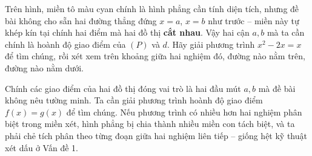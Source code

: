 \begin{center}
\end{center}

\begin{hopgoiy}
Trên hình, miền tô màu cyan chính là hình phẳng cần tính diện tích, nhưng đề bài không cho sẵn hai đường thẳng đứng $x=a$, $x=b$ như trước -- miền này tự khép kín tại chính hai điểm mà hai đồ thị \textbf{cắt nhau}. Vậy hai cận $a, b$ mà ta cần chính là hoành độ giao điểm của $(P)$ và $d$. Hãy giải phương trình $x^2-2x=x$ để tìm chúng, rồi xét xem trên khoảng giữa hai nghiệm đó, đường nào nằm trên, đường nào nằm dưới.
\end{hopgoiy}

\begin{hopyduong}
Chính các giao điểm của hai đồ thị đóng vai trò là hai đầu mút $a, b$ mà đề bài không nêu tường minh. Ta cần giải phương trình hoành độ giao điểm $f(x)=g(x)$ để tìm chúng. Nếu phương trình có nhiều hơn hai nghiệm phân biệt trong miền xét, hình phẳng bị chia thành nhiều miền con tách biệt, và ta phải chẻ tích phân theo từng đoạn giữa hai nghiệm liên tiếp -- giống hệt kỹ thuật xét dấu ở Vấn đề 1.
\end{hopyduong}

